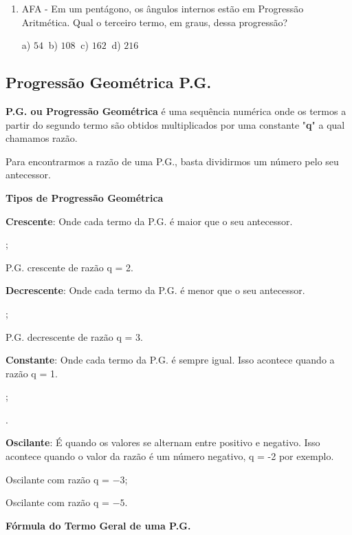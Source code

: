 \begin{multicols*}{2}
\begin{enumerate}
	\item AFA - Em um pentágono, os ângulos internos estão em Progressão Aritmética. Qual o terceiro termo, em graus, dessa progressão?

		a) $54 \ $ b) $108 \ $ c) $162 \ $ d) $216 $

	\end{enumerate}
	
	\subsection{Progressão Geométrica P.G.}
	
	\textbf{P.G. ou Progressão Geométrica} é uma sequência numérica onde os termos a partir do segundo termo são obtidos multiplicados por uma constante "\textbf{q}" a qual chamamos razão.
	
	Para encontrarmos a razão de uma P.G., basta dividirmos um número pelo seu antecessor.
	
	\textbf{Tipos de Progressão Geométrica}

	\textbf{Crescente}: Onde cada termo da P.G. é maior que o seu antecessor.
	
	;
	
	 P.G. crescente de razão q = 2.
	
	\textbf{Decrescente}: Onde cada termo da P.G. é menor que o seu antecessor.
	
	;
	
	 P.G. decrescente de razão q = 3.
	
	\textbf{Constante}: Onde cada termo da P.G. é sempre igual. Isso acontece quando a razão q = 1.
	
	;
	
	.
	
	\textbf{Oscilante}: É quando os valores se alternam entre positivo e negativo. Isso acontece quando o valor da razão é um número negativo, q = -2 por exemplo.
	
	 Oscilante com razão q = $-3$;
	
	 Oscilante com razão q = $-5$.
	
\textbf{Fórmula do Termo Geral de uma P.G.}


\end{multicols*}

